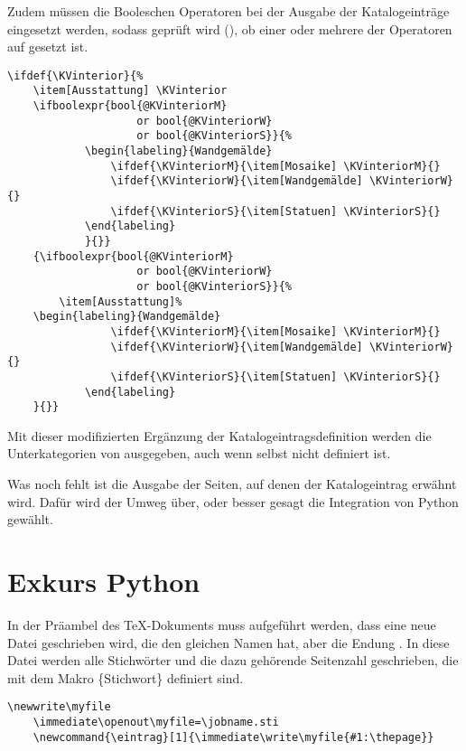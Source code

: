 \documentclass[ngerman]{dtk}
\newcommand{\eintrag}[1]{\immediate\write\myfile{#1:\thepage}}
\begin{document}
Zudem müssen die Booleschen Operatoren bei der Ausgabe der Katalogeinträge eingesetzt werden,
sodass geprüft wird (), ob einer oder mehrere der Operatoren auf  gesetzt ist.
\begin{lstlisting}[style=number]
\ifdef{\KVinterior}{%
	\item[Ausstattung] \KVinterior 
	\ifboolexpr{bool{@KVinteriorM} 
					or bool{@KVinteriorW} 
					or bool{@KVinteriorS}}{%
			\begin{labeling}{Wandgemälde}
				\ifdef{\KVinteriorM}{\item[Mosaike] \KVinteriorM}{}
				\ifdef{\KVinteriorW}{\item[Wandgemälde] \KVinteriorW}{}
				\ifdef{\KVinteriorS}{\item[Statuen] \KVinteriorS}{}
			\end{labeling}
			}{}}
	{\ifboolexpr{bool{@KVinteriorM} 
					or bool{@KVinteriorW} 
					or bool{@KVinteriorS}}{%
		\item[Ausstattung]%
	\begin{labeling}{Wandgemälde}	
				\ifdef{\KVinteriorM}{\item[Mosaike] \KVinteriorM}{}
				\ifdef{\KVinteriorW}{\item[Wandgemälde] \KVinteriorW}{}
				\ifdef{\KVinteriorS}{\item[Statuen] \KVinteriorS}{}
			\end{labeling}
	}{}}
\end{lstlisting}
Mit dieser modifizierten Ergänzung der Katalogeintragsdefinition werden die Unterkategorien von  ausgegeben, 
auch wenn  selbst nicht definiert ist.


Was noch fehlt ist die Ausgabe der Seiten, auf denen der Katalogeintrag
 erwähnt wird.
Dafür wird der Umweg über, oder besser gesagt die Integration von Python gewählt.
\section{Exkurs Python}
In der Präambel des \TeX-Dokuments muss aufgeführt werden, 
dass eine neue Datei geschrieben wird, die den gleichen Namen hat, aber die Endung .
In diese Datei werden alle Stichwörter und die dazu gehörende Seitenzahl geschrieben, 
die mit dem Makro \{Stichwort\}  definiert sind.
\begin{lstlisting}[style=nonumber]
	\newwrite\myfile
	\immediate\openout\myfile=\jobname.sti
	\newcommand{\eintrag}[1]{\immediate\write\myfile{#1:\thepage}}
\end{lstlisting}
\end{document}
